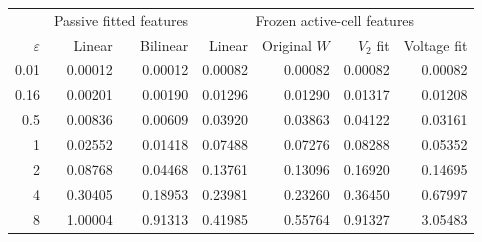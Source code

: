 \begin{tabular}{r*{6}{r}}
\toprule
 & \multicolumn{2}{c}{Passive fitted features} & \multicolumn{4}{c}{Frozen active-cell features}\\
$\varepsilon$ & Linear & Bilinear & Linear & Original $W$ & $V_2$ fit & Voltage fit\\
\midrule
0.01 & 0.00012 & 0.00012 & 0.00082 & 0.00082 & 0.00082 & 0.00082 \\
0.16 & 0.00201 & 0.00190 & 0.01296 & 0.01290 & 0.01317 & 0.01208 \\
0.5 & 0.00836 & 0.00609 & 0.03920 & 0.03863 & 0.04122 & 0.03161 \\
1 & 0.02552 & 0.01418 & 0.07488 & 0.07276 & 0.08288 & 0.05352 \\
2 & 0.08768 & 0.04468 & 0.13761 & 0.13096 & 0.16920 & 0.14695 \\
4 & 0.30405 & 0.18953 & 0.23981 & 0.23260 & 0.36450 & 0.67997 \\
8 & 1.00004 & 0.91313 & 0.41985 & 0.55764 & 0.91327 & 3.05483 \\
\bottomrule
\end{tabular}
